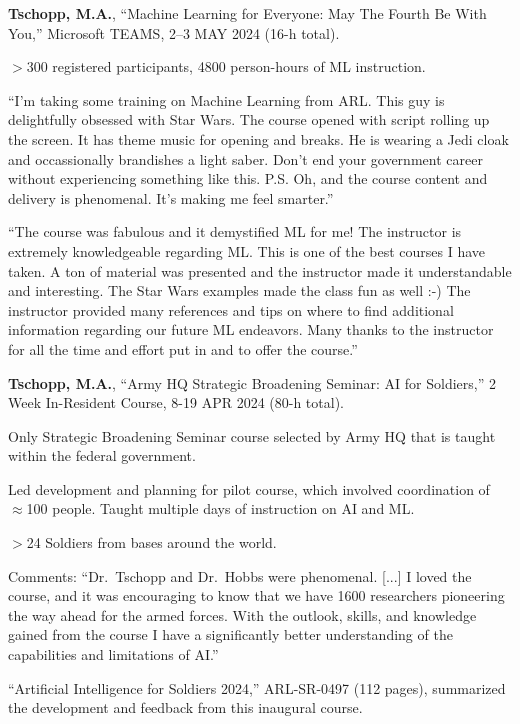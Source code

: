 \begin{cvlist}
\item
\textbf{Tschopp, M.A.}, ``Machine Learning for Everyone: May The Fourth Be With You,'' Microsoft TEAMS, 2--3 MAY 2024 (16-h total).
\begin{list2}
\item[$\star$] $>$300 registered participants, 4800 person-hours of ML instruction.
\item[$\star$] ``I'm taking some training on Machine Learning from ARL.  This guy is delightfully obsessed with Star Wars.  The course opened with script rolling up the screen.  It has theme music for opening and breaks. He is wearing a Jedi cloak and occassionally brandishes a light saber.  Don't end your government career without experiencing something like this.  P.S. Oh, and the course content and delivery is phenomenal.  It's making me feel smarter.''
\item[$\star$] ``The course was fabulous and it demystified ML for me! The instructor is extremely knowledgeable regarding ML. This is one of the best courses I have taken. A ton of material was presented and the instructor made it understandable and interesting. The Star Wars examples made the class fun as well :-) The instructor provided many references and tips on where to find additional information regarding our future ML endeavors. Many thanks to the instructor for all the time and effort put in and to offer the course.''
\end{list2}

\item
\textbf{Tschopp, M.A.}, ``Army HQ Strategic Broadening Seminar: AI for Soldiers,'' 2 Week In-Resident Course, 8-19 APR 2024 (80-h total).
\begin{list2}
\item[$\star$] Only Strategic Broadening Seminar course selected by Army HQ that is taught within the federal government.
\item[$\star$] Led development and planning for pilot course, which involved coordination of $\approx$100 people.  Taught multiple days of instruction on AI and ML.
\item[$\star$] $>$24 Soldiers from bases around the world.
\item[$\star$] Comments: ``Dr.~Tschopp and Dr.~Hobbs were phenomenal. [...] I loved the course, and it was encouraging to know that we have 1600 researchers pioneering the way ahead for the armed forces. With the outlook, skills, and knowledge gained from the course I have a significantly better understanding of the capabilities and limitations of AI.''
\item[$\star$] ``Artificial Intelligence for Soldiers 2024,'' ARL-SR-0497 (112 pages), summarized the development and feedback from this inaugural course.
\end{list2}


\end{cvlist}
